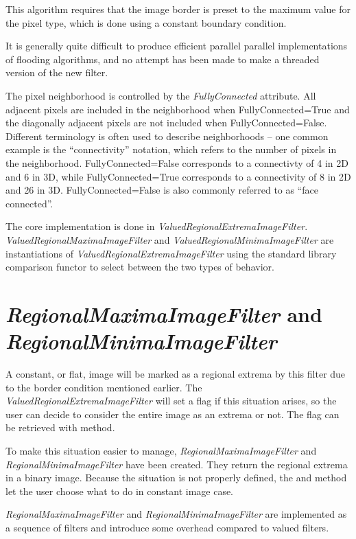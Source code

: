 \documentclass{InsightArticle}
\begin{document}
This algorithm requires that the image border is preset to the maximum
value for the pixel type, which is done using a constant boundary
condition.

It is generally quite difficult to produce efficient parallel parallel
implementations of flooding algorithms, and no attempt has been made
to make a threaded version of the new filter.

The pixel neighborhood is controlled by the {\em FullyConnected}
attribute. All adjacent pixels are included in the neighborhood when
FullyConnected=True and the diagonally adjacent pixels are not
included when FullyConnected=False. Different terminology is often
used to describe neighborhoods -- one common example is the
``connectivity'' notation, which refers to the number of pixels in the
neighborhood. FullyConnected=False corresponds to a connectivty of 4
in 2D and 6 in 3D, while FullyConnected=True corresponds to a
connectivity of 8 in 2D and 26 in 3D. FullyConnected=False is also
commonly referred to as ``face connected''.

The core implementation is done in {\em ValuedRegionalExtremaImageFilter}.
{\em ValuedRegionalMaximaImageFilter} and {\em
ValuedRegionalMinimaImageFilter} are instantiations of {\em
ValuedRegionalExtremaImageFilter} using the standard library
comparison functor to select between the two types of behavior.

\section{{\em RegionalMaximaImageFilter} and {\em RegionalMinimaImageFilter}}
A constant, or flat, image will be marked as a regional extrema by
this filter due to the border condition mentioned earlier. The {\em
ValuedRegionalExtremaImageFilter} will set a flag if this situation
arises, so the user can decide to consider the entire image as an
extrema or not. The flag can be retrieved with  method.

To make this situation easier to manage, {\em RegionalMaximaImageFilter} and
{\em RegionalMinimaImageFilter} have been created. They return the regional
extrema in a binary image. Because the situation is not properly defined, the 
 and  method let the user choose what to do
in constant image case.

{\em RegionalMaximaImageFilter} and {\em RegionalMinimaImageFilter} are implemented as a sequence
of filters and introduce some overhead compared to valued filters.
\end{document}
